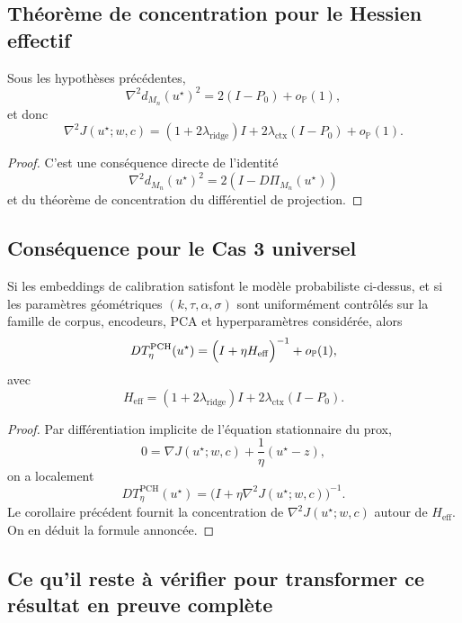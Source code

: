 \subsection{Théorème de concentration pour le Hessien effectif}

\begin{corollary}
Sous les hypothèses précédentes,
\[
\nabla^2 d_{M_n}(u^\star)^2
=
2(I-P_0)+o_{\mathbb P}(1),
\]
et donc
\[
\nabla^2 J(u^\star;w,c)
=
(1+2\lambda_{\mathrm{ridge}})I
+
2\lambda_{\mathrm{ctx}}(I-P_0)
+
o_{\mathbb P}(1).
\]
\end{corollary}

\begin{proof}
C'est une conséquence directe de l'identité
\[
\nabla^2 d_{M_n}(u^\star)^2=2(I-D\Pi_{M_n}(u^\star))
\]
et du théorème de concentration du différentiel de projection.
\end{proof}

\subsection{Conséquence pour le Cas 3 universel}

\begin{theorem}
Si les embeddings de calibration satisfont le modèle probabiliste ci-dessus,
et si les paramètres géométriques \((k,\tau,\alpha,\sigma)\) sont uniformément contrôlés sur la famille de corpus, encodeurs, PCA et hyperparamètres considérée,
alors
\[
DT_\eta^{\mathrm{PCH}}(u^\star)
=
\Bigl(I+\eta H_{\mathrm{eff}}\Bigr)^{-1}
+
o_{\mathbb P}(1),
\]
avec
\[
H_{\mathrm{eff}}
=
(1+2\lambda_{\mathrm{ridge}})I
+
2\lambda_{\mathrm{ctx}}(I-P_0).
\]
\end{theorem}

\begin{proof}
Par différentiation implicite de l'équation stationnaire du prox,
\[
0=\nabla J(u^\star;w,c)+\frac1\eta(u^\star-z),
\]
on a localement
\[
DT_\eta^{\mathrm{PCH}}(u^\star)
=
\bigl(I+\eta\nabla^2J(u^\star;w,c)\bigr)^{-1}.
\]
Le corollaire précédent fournit la concentration de \(\nabla^2J(u^\star;w,c)\) autour de \(H_{\mathrm{eff}}\).  
On en déduit la formule annoncée.
\end{proof}

\subsection{Ce qu'il reste à vérifier pour transformer ce résultat en preuve complète}

